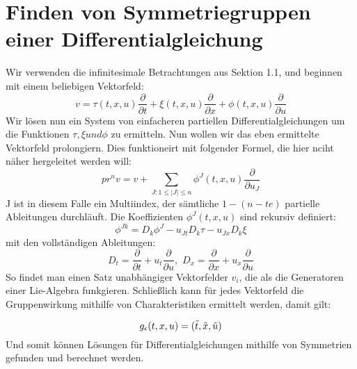 \documentclass[a4paper]{article}
\begin{document}
\section{Finden von Symmetriegruppen einer Differentialgleichung}
Wir verwenden die infinitesimale Betrachtungen aus Sektion 1.1,
und beginnen mit einem beliebigen Vektorfeld:
\begin{equation}
    \label{eq:ansatz}
v=\tau (t,x,u)\frac{\partial}{\partial t}+\xi
(t,x,u)\frac{\partial}{\partial x}+\phi
(t,x,u)\frac{\partial}{\partial u}
\end{equation}
Wir lösen nun
ein System von einfacheren partiellen Differentialgleichungen um
die Funktionen $\tau , \xi und \phi$ zu ermitteln. Nun wollen wir
das eben ermittelte Vektorfeld prolongiern. Dies funktioneirt mit
folgender Formel, die hier nciht näher hergeleitet werden will:
\begin{equation}
    pr^{n}v=v+\sum_{J:1\leq |J|\leq
n}\phi^J(t,x,u)\frac{\partial}{\partial u_J}
\end{equation}
J ist
in diesem Falle ein Multiindex, der sämtliche $1-(n-te)$
partielle Ableitungen durchläuft. Die Koeffizienten
$\phi^J(t,x,u)$ sind rekursiv definiert:
\begin{equation}
\phi^{Jk}=D_k\phi^J-u_{Jt}D_k\tau-u_{Jx}D_k\xi
\end{equation}
mit
den vollständigen Ableitungen: $$D_t=\frac{\partial}{\partial
t}+u_t\frac{\partial}{\partial u},\,\,
D_x=\frac{\partial}{\partial x}+u_x\frac{\partial}{\partial u}$$
\newline So findet man einen Satz unabhängiger Vektorfelder
$v_i$, die als die Generatoren einer Lie-Algebra funkgieren.
Schließlich kann für jedes Vektorfeld die Gruppenwirkung mithilfe
von Charakteristiken ermittelt werden, damit gilt:

\begin{equation}
g_\epsilon(t,x,u)=(\Tilde{t},\Tilde{x},\Tilde{u})
\end{equation}
Und somit können Lösungen für Differentialgleichungen mithilfe
von Symmetrien gefunden und berechnet werden.
\end{document}
